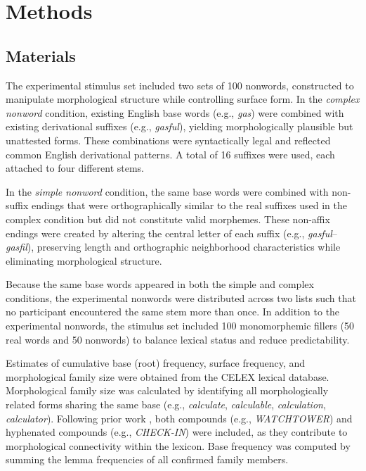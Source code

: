 \documentclass[preprint,12pt, authoryear, review]{elsarticle}
\begin{document}
\section{Methods}

\subsection{Materials}

The experimental stimulus set included two sets of 100 nonwords, constructed to manipulate morphological structure while controlling surface form. In the \textit{complex nonword} condition, existing English base words (e.g., \textit{gas}) were combined with existing derivational suffixes (e.g., \textit{gasful}), yielding morphologically plausible but unattested forms. These combinations were syntactically legal and reflected common English derivational patterns. A total of 16 suffixes were used, each attached to four different stems.

In the \textit{simple nonword} condition, the same base words were combined with non-suffix endings that were orthographically similar to the real suffixes used in the complex condition but did not constitute valid morphemes. These non-affix endings were created by altering the central letter of each suffix (e.g., \textit{gasful}–\textit{gasfil}), preserving length and orthographic neighborhood characteristics while eliminating morphological structure.

Because the same base words appeared in both the simple and complex conditions, the experimental nonwords were distributed across two lists such that no participant encountered the same stem more than once. In addition to the experimental nonwords, the stimulus set included 100 monomorphemic fillers (50 real words and 50 nonwords) to balance lexical status and reduce predictability.

Estimates of cumulative base (root) frequency, surface frequency, and morphological family size were obtained from the CELEX lexical database. Morphological family size was calculated by identifying all morphologically related forms sharing the same base (e.g., \textit{calculate}, \textit{calculable}, \textit{calculation}, \textit{calculator}). Following prior work \citep[e.g.,][]{deJong2001, deJong2003}, both compounds (e.g., \textit{WATCHTOWER}) and hyphenated compounds (e.g., \textit{CHECK-IN}) were included, as they contribute to morphological connectivity within the lexicon. Base frequency was computed by summing the lemma frequencies of all confirmed family members.
\end{document}
